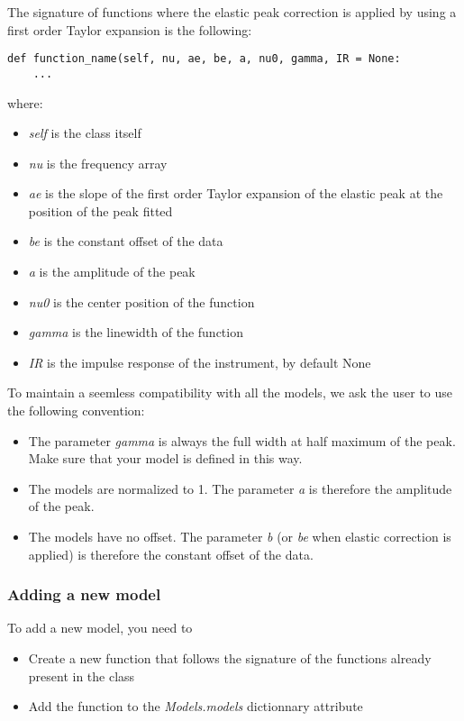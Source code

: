 The signature of functions where the elastic peak correction is applied by using a first order Taylor expansion is the following:
\begin{lstlisting}
def function_name(self, nu, ae, be, a, nu0, gamma, IR = None:
    ...
\end{lstlisting}

where:
\begin{itemize}
    \item \textit{self} is the class itself
    \item \textit{nu} is the frequency array
    \item \textit{ae} is the slope of the first order Taylor expansion of the elastic peak at the position of the peak fitted
    \item \textit{be} is the constant offset of the data
    \item \textit{a} is the amplitude of the peak
    \item \textit{nu0} is the center position of the function
    \item \textit{gamma} is the linewidth of the function        
    \item \textit{IR} is the impulse response of the instrument, by default None
\end{itemize}

To maintain a seemless compatibility with all the models, we ask the user to use the following convention:
\begin{itemize}
    \item The parameter \textit{gamma} is always the full width at half maximum of the peak. Make sure that your model is defined in this way.
    \item The models are normalized to 1. The parameter \textit{a} is therefore the amplitude of the peak.
    \item The models have no offset. The parameter \textit{b} (or \textit{be} when elastic correction is applied) is therefore the constant offset of the data.
\end{itemize}

\subsubsection{Adding a new model}

To add a new model, you need to 
\begin{itemize}
    \item Create a new function that follows the signature of the functions already present in the class
    \item Add the function to the \textit{Models.models} dictionnary attribute
\end{itemize}

